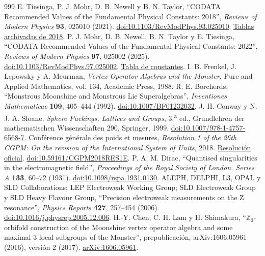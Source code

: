 \begin{thebibliography}{999}
 E. Tiesinga, P. J. Mohr, D. B. Newell y B. N. Taylor, ``CODATA Recommended Values of the Fundamental Physical Constants: 2018'', \emph{Reviews of Modern Physics} \textbf{93}, 025010 (2021). \href{https://doi.org/10.1103/RevModPhys.93.025010}{doi:10.1103/RevModPhys.93.025010}. \href{https://physics.nist.gov/cuu/Constants/ArchiveASCII/allascii_2018.txt}{Tablas archivadas de 2018}.
 P. J. Mohr, D. B. Newell, B. N. Taylor y E. Tiesinga, ``CODATA Recommended Values of the Fundamental Physical Constants: 2022'', \emph{Reviews of Modern Physics} \textbf{97}, 025002 (2025). \href{https://doi.org/10.1103/RevModPhys.97.025002}{doi:10.1103/RevModPhys.97.025002}. \href{https://physics.nist.gov/cuu/Constants/Table/allascii.txt}{Tabla de constantes}.
 I. B. Frenkel, J. Lepowsky y A. Meurman, \emph{Vertex Operator Algebras and the Monster}, Pure and Applied Mathematics, vol. 134, Academic Press, 1988.
 R. E. Borcherds, ``Monstrous Moonshine and Monstrous Lie Superalgebras'', \emph{Inventiones Mathematicae} \textbf{109}, 405--444 (1992). \href{https://doi.org/10.1007/BF01232032}{doi:10.1007/BF01232032}.
 J. H. Conway y N. J. A. Sloane, \emph{Sphere Packings, Lattices and Groups}, 3.\textsuperscript{a} ed., Grundlehren der mathematischen Wissenschaften 290, Springer, 1999. \href{https://doi.org/10.1007/978-1-4757-6568-7}{doi:10.1007/978-1-4757-6568-7}.
 Conférence générale des poids et mesures, \emph{Resolution 1 of the 26th CGPM: On the revision of the International System of Units}, 2018. \href{https://www.bipm.org/en/committees/cg/cgpm/26-2018/resolution-1}{Resolución oficial}. \href{https://doi.org/10.59161/CGPM2018RES1E}{doi:10.59161/CGPM2018RES1E}.
 P. A. M. Dirac, ``Quantised singularities in the electromagnetic field'', \emph{Proceedings of the Royal Society of London. Series A} \textbf{133}, 60--72 (1931). \href{https://doi.org/10.1098/rspa.1931.0130}{doi:10.1098/rspa.1931.0130}.
 ALEPH, DELPHI, L3, OPAL y SLD Collaborations; LEP Electroweak Working Group; SLD Electroweak Group y SLD Heavy Flavour Group, ``Precision electroweak measurements on the Z resonance'', \emph{Physics Reports} \textbf{427}, 257--454 (2006). \href{https://doi.org/10.1016/j.physrep.2005.12.006}{doi:10.1016/j.physrep.2005.12.006}.
 H.-Y. Chen, C. H. Lam y H. Shimakura, ``\(\mathbb Z_3\)-orbifold construction of the Moonshine vertex operator algebra and some maximal \(3\)-local subgroups of the Monster'', prepublicación, arXiv:1606.05961 (2016), versión 2 (2017). \href{https://arxiv.org/abs/1606.05961}{arXiv:1606.05961}.

\end{thebibliography}
